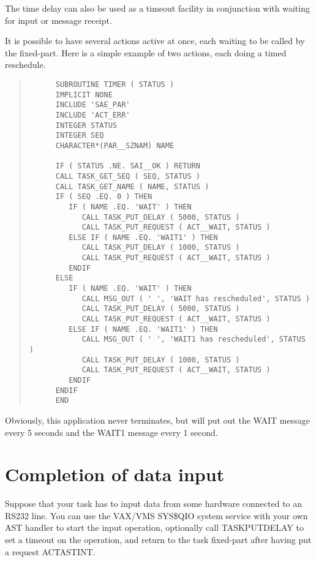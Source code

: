 \documentclass[twoside,11pt]{article}
\newcommand{\xlabel}[1]{}
\renewcommand{\_}{\texttt{\symbol{95}}}
\begin{document}
The time delay can also be used as a timeout facility in conjunction
with waiting for input or message receipt. 

It is possible to have several actions active at once, each waiting to 
be called by the fixed-part. Here is a simple example of two actions, 
each doing a timed reschedule.

\small \begin{quote} \begin{verbatim}
      SUBROUTINE TIMER ( STATUS )
      IMPLICIT NONE
      INCLUDE 'SAE_PAR'
      INCLUDE 'ACT_ERR'
      INTEGER STATUS
      INTEGER SEQ
      CHARACTER*(PAR__SZNAM) NAME

      IF ( STATUS .NE. SAI__OK ) RETURN
      CALL TASK_GET_SEQ ( SEQ, STATUS )
      CALL TASK_GET_NAME ( NAME, STATUS )
      IF ( SEQ .EQ. 0 ) THEN
         IF ( NAME .EQ. 'WAIT' ) THEN
            CALL TASK_PUT_DELAY ( 5000, STATUS )
            CALL TASK_PUT_REQUEST ( ACT__WAIT, STATUS )
         ELSE IF ( NAME .EQ. 'WAIT1' ) THEN
            CALL TASK_PUT_DELAY ( 1000, STATUS )
            CALL TASK_PUT_REQUEST ( ACT__WAIT, STATUS )
         ENDIF
      ELSE
         IF ( NAME .EQ. 'WAIT' ) THEN
            CALL MSG_OUT ( ' ', 'WAIT has rescheduled', STATUS )
            CALL TASK_PUT_DELAY ( 5000, STATUS )
            CALL TASK_PUT_REQUEST ( ACT__WAIT, STATUS )
         ELSE IF ( NAME .EQ. 'WAIT1' ) THEN
            CALL MSG_OUT ( ' ', 'WAIT1 has rescheduled', STATUS )
            CALL TASK_PUT_DELAY ( 1000, STATUS )
            CALL TASK_PUT_REQUEST ( ACT__WAIT, STATUS )
         ENDIF
      ENDIF
      END
\end{verbatim} \end{quote} \normalsize

Obviously, this application never terminates, but will put out the WAIT 
message every 5 seconds and the WAIT1 message every 1 second.

\section{Completion of data input\xlabel{completion_of_data_input}}

Suppose that your task has to input data from some hardware connected to 
an RS232 line. You can use the VAX/VMS SYS\$QIO system service with your 
own AST handler to start the input operation, optionally call 
TASK\_PUT\_DELAY to set a timeout on the operation, and return 
to the task fixed-part after having put a request ACT\_\_ASTINT. 
\end{document}
